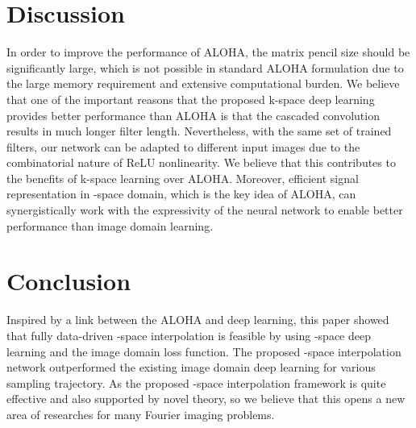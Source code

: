 \documentclass[10pt,journal]{IEEEtran}
\newcommand{\0}{{\boldsymbol{0}}}
\begin{document}
\section{Discussion}

In order to improve the performance of ALOHA, the matrix pencil size should be significantly large, which is not possible in standard ALOHA formulation due to the large memory requirement and extensive computational burden. 
We believe that one of the important reasons that the proposed k-space deep learning provides better performance than ALOHA is that  the cascaded convolution results in much longer filter length. Nevertheless, 
with the same set of trained filters, our network can  be adapted to different input images due to the
combinatorial nature of ReLU nonlinearity. We believe that this contributes to the benefits of k-space learning over ALOHA.
Moreover, efficient signal representation in  -space domain, which is the key idea of ALOHA,  can 
synergistically work with the expressivity of the neural network to enable better performance than image domain learning.



\section{Conclusion}\label{sec:conclusion}

Inspired by a link between the ALOHA and deep learning,
this paper showed that fully data-driven -space interpolation is feasible by using -space deep learning
 and the image domain loss function. The proposed -space interpolation network  outperformed the
existing image domain deep learning for various sampling trajectory.
As the proposed -space interpolation framework is quite effective and also supported by novel theory, 
so we believe that this opens a new area of researches for many Fourier imaging problems.
\end{document}
